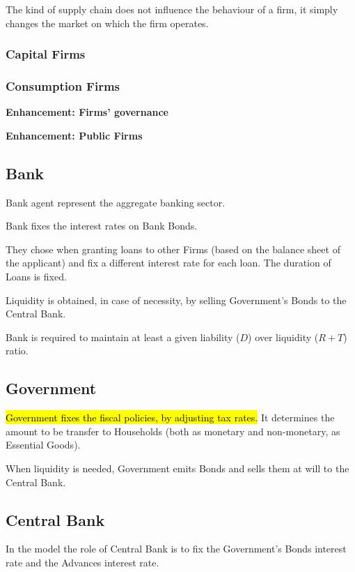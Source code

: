 \documentclass[a4paper, headings=standardclasses]{scrartcl}
\newenvironment{enh}[1][]{\begin{framed}\noindent\textbf{Enhancement: #1}\par}{\end{framed}}
\begin{document}
The kind of supply chain does not influence the behaviour of a firm, it simply changes the market on which the firm operates.

\subsubsection{Capital Firms}

\subsubsection{Consumption Firms}

\begin{enh}[Firms' governance]

\end{enh}

\begin{enh}[Public Firms]
\end{enh}


\subsection{Bank}
Bank agent represent the aggregate banking sector.

Bank fixes the interest rates on Bank Bonds.

They chose when granting loans to other Firms (based on the balance sheet of the applicant) and fix a different interest rate for each loan. The duration of Loans is fixed.

Liquidity is obtained, in case of necessity, by selling Government's Bonds to the Central Bank.

Bank is required to maintain at least a given liability ($D$) over liquidity ($R+T$) ratio.

\subsection{Government}
\hl{Government fixes the fiscal policies, by adjusting tax rates.} It determines the amount to be transfer to Households (both as monetary and non-monetary, as Essential Goods).

When liquidity is needed, Government emits Bonds and sells them at will to the Central Bank.

\subsection{Central Bank}
In the model the role of Central Bank is to fix the Government's Bonds interest rate and the Advances interest rate.
\end{document}
